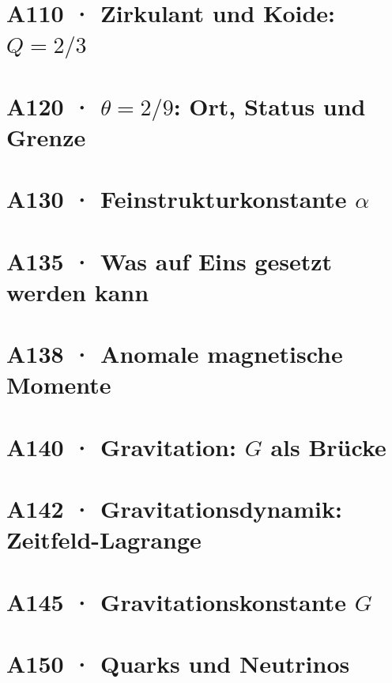 \documentclass[11pt,twoside,openright]{book}
\begin{document}
\chapter[A110 · Zirkulant und Koide]{A110 · Zirkulant und Koide: $Q=2/3$}


\chapter[A120 · $\theta = 2/9$]{A120 · $\theta=2/9$: Ort, Status und Grenze}


\chapter[A130 · Feinstrukturkonstante]{A130 · Feinstrukturkonstante $\alpha$}


\chapter[A135 · Was auf Eins gesetzt werden kann]{A135 · Was auf Eins gesetzt werden kann}


\chapter[A138 · Anomale magnetische Momente]{A138 · Anomale magnetische Momente}


\chapter[A140 · Gravitation: $G$ als Brücke]{A140 · Gravitation: $G$ als Brücke}


\chapter[A142 · Gravitationsdynamik]{A142 · Gravitationsdynamik: Zeitfeld-Lagrange}


\chapter[A145 · Gravitationskonstante]{A145 · Gravitationskonstante $G$}


\chapter[A150 · Quarks und Neutrinos]{A150 · Quarks und Neutrinos}

\end{document}
